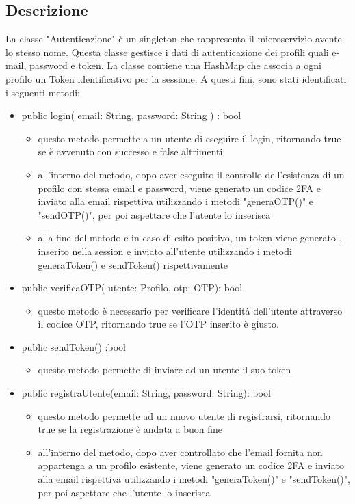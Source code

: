 \documentclass{report}
\begin{document}
\subsection{Descrizione}
La classe "Autenticazione" è un singleton che rappresenta il microservizio avente lo stesso nome. 
Questa classe gestisce i dati di autenticazione dei profili quali e-mail, password e token. 
La classe contiene una HashMap che associa a ogni profilo un Token identificativo per la sessione.
A questi fini, sono stati identificati i seguenti metodi:
\begin{itemize}
	\item public login( email: String, password: String ) : bool
		\begin{itemize}
			\item questo metodo permette a un utente di eseguire il login, ritornando true se è avvenuto con successo e false altrimenti
			\item all'interno del metodo, dopo aver eseguito il controllo dell'esistenza di un profilo con stessa email e password,
			viene generato un codice 2FA e inviato alla email rispettiva utilizzando i metodi "generaOTP()" e "sendOTP()", per poi aspettare che l'utente lo inserisca
			\item alla fine del metodo e in caso di esito positivo, un token viene generato , inserito nella session e inviato all'utente utilizzando i metodi generaToken() e sendToken() rispettivamente
		\end{itemize}
	\item public verificaOTP( utente: Profilo, otp: OTP): bool
		\begin{itemize}
			\item questo metodo è necessario per verificare l'identità dell'utente attraverso il codice OTP, ritornando true se l'OTP inserito è giusto.
		\end{itemize}
	\item public sendToken() :bool 
		\begin{itemize}
			\item questo metodo permette di inviare ad un utente il suo token
		\end{itemize}
	\item public registraUtente(email: String, password: String): bool
		\begin{itemize}
			\item questo metodo permette ad un nuovo utente di registrarsi, ritornando true se la registrazione è andata a buon fine
			\item all'interno del metodo, dopo aver controllato che l'email fornita non appartenga a un profilo esistente, viene generato un codice 2FA e inviato alla email rispettiva utilizzando i metodi "generaToken()" e "sendToken()", per poi aspettare che l'utente lo inserisca

\end{itemize}
\end{itemize}
\end{document}
